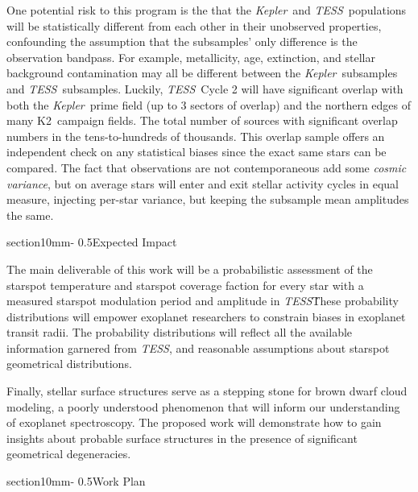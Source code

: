 \documentclass[letterpaper,11pt]{article}
\makeatletter
\renewcommand{\section}{\@startsection%
{section}{1}{0mm}{-\baselineskip}%
{0.5\baselineskip}{\normalfont\Large\bfseries}}%
\newcommand{\tess}{{\it TESS}}
\newcommand{\kepler}{{\it Kepler}}
\newcommand{\ktwo}{{K2}}
\makeatother
\begin{document}
One potential risk to this program is the that the \kepler\ and \tess\ populations will be statistically different from each other in their unobserved properties, confounding the assumption that the subsamples' only difference is the observation bandpass.  For example, metallicity, age, extinction, and stellar background contamination may all be different between the \kepler\ subsamples and \tess\ subsamples.  Luckily, \tess\ Cycle 2 will have significant overlap with both the \kepler\ prime field (up to 3 sectors of overlap) and the northern edges of many \ktwo\ campaign fields.  The total number of sources with significant overlap numbers in the tens-to-hundreds of thousands.  This overlap sample offers an independent check on any statistical biases since the exact same stars can be compared.  The fact that observations are not contemporaneous add some \emph{cosmic variance}, but on average stars will enter and exit stellar activity cycles in equal measure, injecting per-star variance, but keeping the subsample mean amplitudes the same.

\section{Expected Impact}

The main deliverable of this work will be a probabilistic assessment of the starspot temperature and starspot coverage faction for every star with a measured starspot modulation period and amplitude in \tess\.  These probability distributions will empower exoplanet researchers to constrain biases in exoplanet transit radii.  The probability distributions will reflect all the available information garnered from \tess, and reasonable assumptions about starspot geometrical distributions.

Finally, stellar surface structures serve as a stepping stone for brown dwarf cloud modeling, a poorly understood phenomenon that will inform our understanding of exoplanet spectroscopy.  The proposed work will demonstrate how to gain insights about probable surface structures in the presence of significant geometrical degeneracies.


\section{Work Plan}
\end{document}
